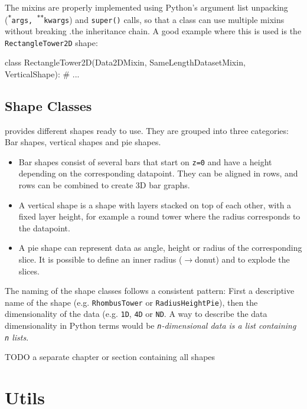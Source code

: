 The mixins are properly implemented using Python's argument list unpacking
(\texttt{\textsuperscript{*}args, \textsuperscript{**}kwargs}) and
\texttt{super()} calls, so that a class can use multiple mixins without breaking
.the inheritance chain. A good example where this is used is the
\texttt{RectangleTower2D} shape:

\vspace{.5\baselineskip}

\begin{pythoncode}
class RectangleTower2D(Data2DMixin,
    SameLengthDatasetMixin, VerticalShape):
    # ...
\end{pythoncode}

\subsection{Shape Classes}

\tangible{} provides different shapes ready to use. They are grouped into three
categories: Bar shapes, vertical shapes and  pie shapes.

\begin{itemize}
	\item Bar shapes consist of several bars that start on \texttt{z=0} and have a
		height depending on the corresponding datapoint. They can be aligned in
		rows, and rows can be combined to create 3D bar graphs.
	\item A vertical shape is a shape with layers stacked on top of each other,
		with a fixed layer height, for example a round tower where the radius
		corresponds to the datapoint.
	\item A pie shape can represent data as angle, height or radius of the
		corresponding slice. It is possible to define an inner radius ($\rightarrow$donut) and
		to explode the slices.
\end{itemize}

\noindent The naming of the shape classes follows a consistent pattern: First a
descriptive name of the shape (e.g. \texttt{RhombusTower} or
\texttt{RadiusHeightPie}), then the dimensionality of the data (e.g.
\texttt{1D}, \texttt{4D} or \texttt{ND}. A way to describe the data
dimensionality in Python terms would be \emph{\texttt{n}-dimensional data is a
list containing \texttt{n} lists}.

TODO a separate chapter or section containing all shapes


\section{Utils}\label{sec:utils}
